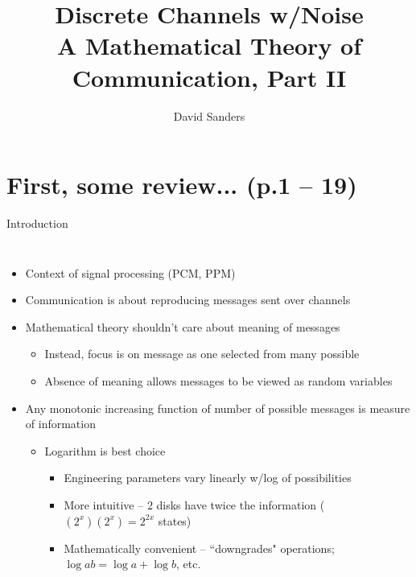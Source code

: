 \documentclass{beamer}
\title{%
  Discrete Channels w/Noise \\
  \normalsize A Mathematical Theory of Communication, Part II}
\author{David Sanders}
\begin{document}
  \maketitle

  \section{First, some review... \small (p.1 -- 19)}

  \begin{frame}{Introduction}
    \begin{columns}

      \column{\dimexpr\paperwidth-10pt}

      \begin{itemize}
        \item Context of signal processing (PCM, PPM)
        \item Communication is about reproducing messages sent over channels
        \item Mathematical theory shouldn't care about meaning of messages
        \begin{itemize}
          \item Instead, focus is on message as one selected from many possible
          \item Absence of meaning allows messages to be viewed as random variables
        \end{itemize}
        \item Any monotonic increasing function of number of possible messages
        is measure of information
        \begin{itemize}
          \item Logarithm is best choice
          \begin{itemize}
            \item Engineering parameters vary linearly w/log of possibilities
            \item More intuitive -- 2 disks have twice the information ($(2^x)(2^x) = 2^{2x}$ states)
            \item Mathematically convenient -- ``downgrades" operations; $\log ab = \log a + \log b$, etc.
          \end{itemize}
        \end{itemize}
      \end{itemize}

    \end{columns}
  \end{frame}
\end{document}
